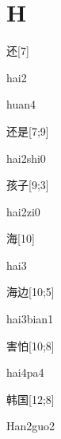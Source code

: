 ﻿%
\section*{H}

\begin{verbete}[hai2]{还}[7]
\begin{pronuncia}{hai2}
\end{pronuncia}
\begin{pronuncia}{huan4}
\end{pronuncia}
\end{verbete}

\begin{verbete}{还是}[7;9]
\begin{pronuncia}{hai2shi0}
\end{pronuncia}
\end{verbete}

\begin{verbete}[hai2zi0]{孩子}[9;3]
\begin{pronuncia}{hai2zi0}
\end{pronuncia}
\end{verbete}

\begin{verbete}[hai3]{海}[10]
\begin{pronuncia}{hai3}
\end{pronuncia}
\end{verbete}

\begin{verbete}{海边}[10;5]
\begin{pronuncia}{hai3bian1}
\end{pronuncia}
\end{verbete}

\begin{verbete}[hai4pa4]{害怕}[10;8]
\begin{pronuncia}{hai4pa4}
\end{pronuncia}
\end{verbete}

\begin{verbete}{韩国}[12;8]
\begin{pronuncia}{Han2guo2}
\end{pronuncia}
\end{verbete}

